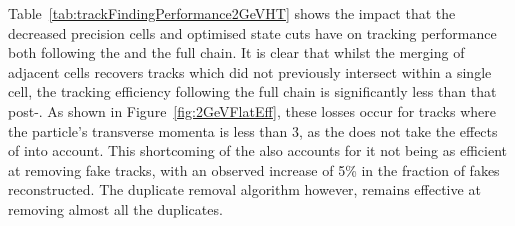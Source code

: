 Table~\ref{tab:trackFindingPerformance2GeVHT} shows the impact that the decreased precision \HT cells and optimised \KF state cuts have on tracking performance both following the \HT and the full chain.
It is clear that whilst the merging of adjacent \HT cells recovers  tracks which did not previously intersect within a single \HT cell, the tracking efficiency following the full chain is significantly less than that post-\HT.
As shown in Figure~\ref{fig:2GeVFlatEff}, these losses occur for tracks where the particle's transverse momenta is less than 3\GeV, as the \KF does not take the effects of \MS into account.
This shortcoming of the \KF also accounts for it not being as efficient at removing fake tracks, with an observed increase of 5\% in the fraction of fakes reconstructed.
The duplicate removal algorithm however, remains effective at removing almost all the duplicates.

\begin{table}[htbp]
\label{tab:trackFindingPerformance2GeVHT}
  \centering

\end{table}

